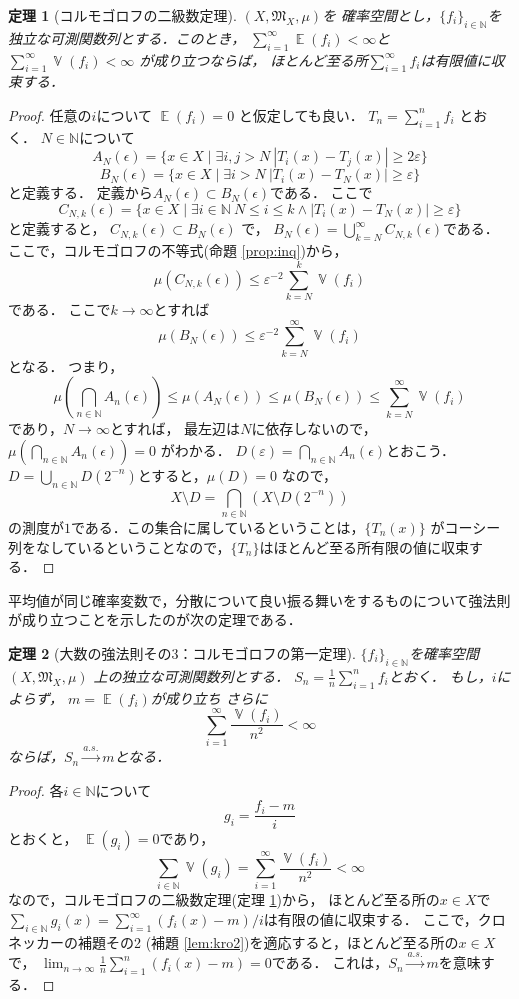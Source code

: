 \documentclass[leqno, a4paper, 12pt]{jsarticle}
\newtheorem{thm}{定理}
\newcommand{\nn}{\mathbb{N}}
\newcommand{\ep}{\varepsilon}
\DeclareMathOperator{\mean}{\mathbb{E}}
\DeclareMathOperator{\varian}{\mathbb{V}}
\begin{document}
\begin{thm}[コルモゴロフの二級数定理]\label{thm:kotwo}
$(X, \mathfrak{M}_X, \mu)$を
確率空間とし，$\{f_i\}_{i\in \nn}$を独立な可測関数列とする．このとき，
$\sum_{i=1}^{\infty}\mean(f_i)<\infty$と
$\sum_{i=1}^{\infty}\varian(f_i)<\infty$
が成り立つならば，
ほとんど至る所$\sum_{i=1}^{\infty}f_i$は有限値に収束する．
\end{thm}
\begin{proof}
任意の$i$について
$\mean(f_i)=0$
と仮定しても良い．
$T_n=\sum_{i=1}^nf_i$
とおく．
$N\in \nn$について
\[
A_{N}(\epsilon)=\{x\in X\mid \exists i, j>N\ |T_i(x)-T_j(x)|\ge 2\ep\}
\]
\[
B_{N}(\epsilon)=
\{x\in X\mid \exists i>N\ |T_i(x)-T_N(x)|\ge \ep\}
\]
と定義する．
定義から$A_{N}(\epsilon)\subset B_{N}(\epsilon)$である．
ここで
\[
C_{N, k}(\epsilon)=\{x\in X\mid \exists i\in \nn\ N\le i\le k\land |T_i(x)-T_N(x)|\ge \ep\}
\]
と定義すると，
$C_{N, k}(\epsilon)\subset B_{N}(\epsilon)$
で，
$B_{N}(\epsilon)=\bigcup_{k=N}^{\infty}C_{N, k}(\epsilon)$である．
ここで，コルモゴロフの不等式(命題 \ref{prop:inq})から，
\[
\mu(C_{N, k}(\epsilon))\le 
\ep^{-2}\sum_{k=N}^{k}\varian(f_i)
\]
である．
ここで$k\to \infty$とすれば
\[
\mu(B_{N}(\epsilon))
\le \ep^{-2}\sum_{k=N}^{\infty}\varian(f_i)
\]
となる．
つまり，
\[
\mu\left(\bigcap_{n\in \nn}A_n(\epsilon)\right)\le \mu(A_{N}(\epsilon))
\le \mu(B_{N}(\epsilon))\le
 \sum_{k=N}^{\infty}\varian(f_i)
\]
であり，$N\to \infty$とすれば，
最左辺は$N$に依存しないので，
$\mu\left(\bigcap_{n\in \nn}A_{n}(\epsilon)\right)=0$
がわかる．
 $D(\ep)=\bigcap_{n\in \nn}A_{n}(\epsilon)$とおこう．
 $D=\bigcup_{n\in \nn}D(2^{-n})$とすると，$\mu(D)=0$
 なので，
 \[
X\setminus D=\bigcap_{n\in \nn}(X\setminus D(2^{-n}))
 \]
 の測度が$1$である．この集合に属しているということは，$\{T_n(x)\}$
 がコーシー列をなしているということなので，$\{T_n\}$はほとんど至る所有限の値に収束する．
\end{proof}


平均値が同じ確率変数で，分散について良い振る舞いをするものについて強法則が成り立つことを示したのが次の定理である．
\begin{thm}[大数の強法則その3：コルモゴロフの第一定理]
\label{thm:strlaw3}
$\{f_i\}_{i\in \nn}$を確率空間
$(X, \mathfrak{M}_X, \mu)$
上の独立な可測関数列とする．
$S_n=\frac{1}{n}\sum_{i=1}^nf_{i}$とおく．
もし，$i$によらず，
$m=\mean(f_i)$が成り立ち
さらに
\[
\sum_{i=1}^{\infty}\frac{\varian(f_i)}{n^2}<\infty
\]
ならば，$S_n\xrightarrow{a. s. }m$となる．
\end{thm}
\begin{proof}
各$i\in \nn$について
\[
g_i=\frac{f_i-m}{i}
\]
とおくと，
$\mean(g_i)=0$であり，
\[
\sum_{i\in \nn}\varian(g_i)
=\sum_{i=1}^{\infty}\frac{\varian(f_i)}{n^2}<\infty
\]
なので，コルモゴロフの二級数定理(定理 \ref{thm:kotwo})から，
ほとんど至る所の$x\in X$で
$\sum_{i\in \nn}g_i(x)=\sum_{i=1}^{\infty}(f_i(x)-m)/i$は有限の値に収束する．
ここで，クロネッカーの補題その2 (補題 \ref{lem:kro2})を適応すると，ほとんど至る所の$x\in X$で，
$\lim_{n\to \infty}\frac{1}{n}\sum_{i=1}^n(f_i(x)-m)=0$である．
これは，$S_n\xrightarrow{a. s. } m$を意味する．
\end{proof}
\end{document}
